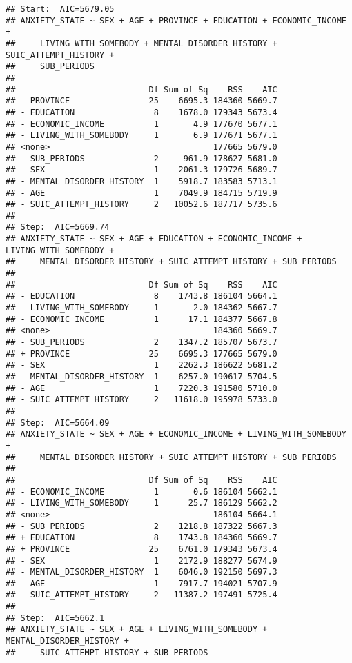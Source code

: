 \documentclass[
]{book}
\begin{document}
\begin{verbatim}
## Start:  AIC=5679.05
## ANXIETY_STATE ~ SEX + AGE + PROVINCE + EDUCATION + ECONOMIC_INCOME + 
##     LIVING_WITH_SOMEBODY + MENTAL_DISORDER_HISTORY + SUIC_ATTEMPT_HISTORY + 
##     SUB_PERIODS
## 
##                           Df Sum of Sq    RSS    AIC
## - PROVINCE                25    6695.3 184360 5669.7
## - EDUCATION                8    1678.0 179343 5673.4
## - ECONOMIC_INCOME          1       4.9 177670 5677.1
## - LIVING_WITH_SOMEBODY     1       6.9 177671 5677.1
## <none>                                 177665 5679.0
## - SUB_PERIODS              2     961.9 178627 5681.0
## - SEX                      1    2061.3 179726 5689.7
## - MENTAL_DISORDER_HISTORY  1    5918.7 183583 5713.1
## - AGE                      1    7049.9 184715 5719.9
## - SUIC_ATTEMPT_HISTORY     2   10052.6 187717 5735.6
## 
## Step:  AIC=5669.74
## ANXIETY_STATE ~ SEX + AGE + EDUCATION + ECONOMIC_INCOME + LIVING_WITH_SOMEBODY + 
##     MENTAL_DISORDER_HISTORY + SUIC_ATTEMPT_HISTORY + SUB_PERIODS
## 
##                           Df Sum of Sq    RSS    AIC
## - EDUCATION                8    1743.8 186104 5664.1
## - LIVING_WITH_SOMEBODY     1       2.0 184362 5667.7
## - ECONOMIC_INCOME          1      17.1 184377 5667.8
## <none>                                 184360 5669.7
## - SUB_PERIODS              2    1347.2 185707 5673.7
## + PROVINCE                25    6695.3 177665 5679.0
## - SEX                      1    2262.3 186622 5681.2
## - MENTAL_DISORDER_HISTORY  1    6257.0 190617 5704.5
## - AGE                      1    7220.3 191580 5710.0
## - SUIC_ATTEMPT_HISTORY     2   11618.0 195978 5733.0
## 
## Step:  AIC=5664.09
## ANXIETY_STATE ~ SEX + AGE + ECONOMIC_INCOME + LIVING_WITH_SOMEBODY + 
##     MENTAL_DISORDER_HISTORY + SUIC_ATTEMPT_HISTORY + SUB_PERIODS
## 
##                           Df Sum of Sq    RSS    AIC
## - ECONOMIC_INCOME          1       0.6 186104 5662.1
## - LIVING_WITH_SOMEBODY     1      25.7 186129 5662.2
## <none>                                 186104 5664.1
## - SUB_PERIODS              2    1218.8 187322 5667.3
## + EDUCATION                8    1743.8 184360 5669.7
## + PROVINCE                25    6761.0 179343 5673.4
## - SEX                      1    2172.9 188277 5674.9
## - MENTAL_DISORDER_HISTORY  1    6046.0 192150 5697.3
## - AGE                      1    7917.7 194021 5707.9
## - SUIC_ATTEMPT_HISTORY     2   11387.2 197491 5725.4
## 
## Step:  AIC=5662.1
## ANXIETY_STATE ~ SEX + AGE + LIVING_WITH_SOMEBODY + MENTAL_DISORDER_HISTORY + 
##     SUIC_ATTEMPT_HISTORY + SUB_PERIODS

\end{verbatim}
\end{document}
